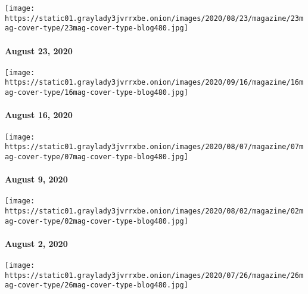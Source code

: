\href{https://www.nytimes3xbfgragh.onion/issue/magazine/2020/08/21/the-82320-issue}{}

\texttt{[image: https://static01.graylady3jvrrxbe.onion/images/2020/08/23/magazine/23mag-cover-type/23mag-cover-type-blog480.jpg]}

\hypertarget{august-23-2020}{%
\paragraph{August 23, 2020}\label{august-23-2020}}

\href{https://www.nytimes3xbfgragh.onion/issue/magazine/2020/08/20/the-81620-issue}{}

\texttt{[image: https://static01.graylady3jvrrxbe.onion/images/2020/09/16/magazine/16mag-cover-type/16mag-cover-type-blog480.jpg]}

\hypertarget{august-16-2020}{%
\paragraph{August 16, 2020}\label{august-16-2020}}

\href{https://www.nytimes3xbfgragh.onion/issue/magazine/2020/08/07/the-8920-issue}{}

\texttt{[image: https://static01.graylady3jvrrxbe.onion/images/2020/08/07/magazine/07mag-cover-type/07mag-cover-type-blog480.jpg]}

\hypertarget{august-9-2020}{%
\paragraph{August 9, 2020}\label{august-9-2020}}

\href{https://www.nytimes3xbfgragh.onion/issue/magazine/2020/07/31/the-8220-issue}{}

\texttt{[image: https://static01.graylady3jvrrxbe.onion/images/2020/08/02/magazine/02mag-cover-type/02mag-cover-type-blog480.jpg]}

\hypertarget{august-2-2020}{%
\paragraph{August 2, 2020}\label{august-2-2020}}

\href{https://www.nytimes3xbfgragh.onion/issue/magazine/2020/07/24/the-72620-issue}{}

\texttt{[image: https://static01.graylady3jvrrxbe.onion/images/2020/07/26/magazine/26mag-cover-type/26mag-cover-type-blog480.jpg]}

